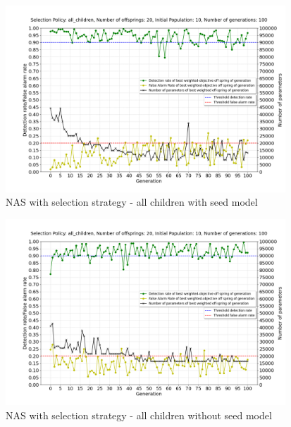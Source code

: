 \begin{figure}[ht!]
    \centering
        \includegraphics[width=1.0\linewidth, height=7cm]{BachelorMasterThesis/ExperimentsAndResults/Figures/all_children/all_children_3_3_1_seed_model_mutation_rate_10_30_5_10.png}
        \caption{NAS with selection strategy - all children with seed model}
        \label{fig:all_children_3_3_1_seed_model_mutation_rate_10_30_5_10}
\end{figure}

\begin{figure}[ht!]
    \centering
        \includegraphics[width=1.0\linewidth, height=7cm]{BachelorMasterThesis/ExperimentsAndResults/Figures/all_children/all_children_3_3_1_no_seed_model_mutation_rate_10_30_5_10.png}
        \caption{NAS with selection strategy - all children without seed model}
        \label{fig:all_children_3_3_1_no_seed_model_mutation_rate_10_30_5_10}
\end{figure}

